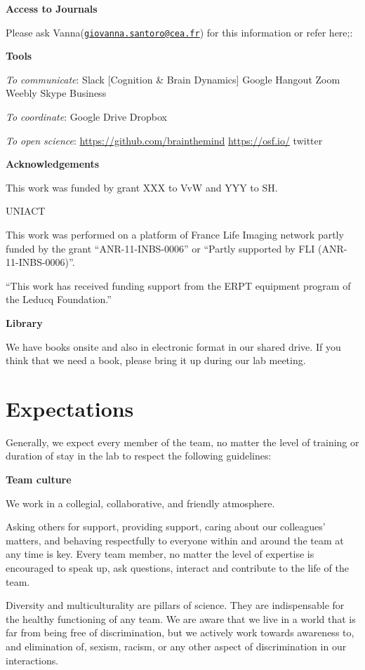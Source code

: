 \documentclass[]{book}
\begin{document}
\textbf{Access to Journals}

Please ask Vanna(\href{mailto:giovanna.santoro@cea.fr}{\nolinkurl{giovanna.santoro@cea.fr}}) for this information or refer here;:

\textbf{Tools}

\emph{To communicate}:
Slack {[}Cognition \& Brain Dynamics{]}
Google Hangout
Zoom
Weebly
Skype Business

\emph{To coordinate}:
Google Drive
Dropbox

\emph{To open science}:
\url{https://github.com/brainthemind}
\url{https://osf.io/}
twitter

\textbf{Acknowledgements}

This work was funded by grant XXX to VvW and YYY to SH.

UNIACT

This work was performed on a platform of France Life Imaging network partly funded by the grant ``ANR-11-INBS-0006'' or ``Partly supported by FLI (ANR-11-INBS-0006)''.

``This work has received funding support from the ERPT equipment program of the Leducq Foundation.''

\textbf{Library}

We have books onsite and also in electronic format in our shared drive.
If you think that we need a book, please bring it up during our lab meeting.

\hypertarget{expectations}{%
\chapter{Expectations}\label{expectations}}

Generally, we expect every member of the team, no matter the level of training or duration of stay in the lab to respect the following guidelines:

\textbf{Team culture}

We work in a collegial, collaborative, and friendly atmosphere.

Asking others for support, providing support, caring about our colleagues' matters, and behaving respectfully to everyone within and around the team at any time is key. Every team member, no matter the level of expertise is encouraged to speak up, ask questions, interact and contribute to the life of the team.

Diversity and multiculturality are pillars of science. They are indispensable for the healthy functioning of any team. We are aware that we live in a world that is far from being free of discrimination, but we actively work towards awareness to, and elimination of, sexism, racism, or any other aspect of discrimination in our interactions.
\end{document}
